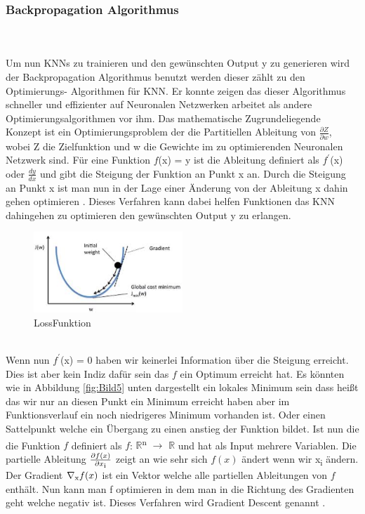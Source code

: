\documentclass{llncs}
\begin{document}
	\subsubsection{Backpropagation Algorithmus}\label{sec:test}
	~\\\\
	Um nun KNNs zu trainieren und den gewünschten Output y zu generieren wird der Backpropagation Algorithmus benutzt werden dieser zählt zu den Optimierungs- Algorithmen für KNN. Er konnte zeigen das dieser Algorithmus schneller und effizienter auf Neuronalen Netzwerken arbeitet als andere Optimierungsalgorithmen vor ihm. Das mathematische Zugrundeliegende Konzept ist ein Optimierungsproblem der die Partitiellen Ableitung von  $\frac{\partial Z}{\partial w}$, wobei Z die Zielfunktion und w die Gewichte im zu optimierenden Neuronalen Netzwerk sind. Für eine Funktion $f$(x) = y ist die Ableitung definiert als $f^\prime$(x) oder $\frac{dy}{dx}$ und gibt die Steigung der Funktion an Punkt x an. Durch die Steigung an Punkt x ist man nun in der Lage einer Änderung von der Ableitung x dahin gehen optimieren \cite{Grundlagen}. Dieses Verfahren kann dabei helfen Funktionen das KNN  dahingehen zu optimieren den gewünschten Output y zu erlangen. 
	\\
	\begin{figure}[htbp] 
		\centering
		\includegraphics[width=0.5\textwidth]{gradient.png}
		\caption{LossFunktion}
		\label{fig:Bild6}
	\end{figure}
	\\
	Wenn nun $f^\prime$(x) = 0 haben wir keinerlei Information über die Steigung erreicht. Dies ist aber kein Indiz dafür sein das $f$ ein Optimum erreicht hat. Es könnten wie in Abbildung \ref{fig:Bild5} unten dargestellt ein lokales Minimum sein dass heißt das wir nur an diesen Punkt ein Minimum erreicht haben aber im Funktionsverlauf ein noch niedrigeres Minimum vorhanden ist. Oder einen Sattelpunkt welche ein Übergang zu einen anstieg der Funktion bildet.
	Ist nun die die Funktion $f$ definiert als $f$: $\mathbb{R}$\textsuperscript{n} $\rightarrow$  $\mathbb{R}$ und hat als Input mehrere Variablen. Die partielle Ableitung $\frac{\partial f(x)}{\partial x\textsubscript{i}}$ zeigt an wie sehr sich $f(x)$ ändert wenn wir x\textsubscript{i} ändern. Der Gradient $\nabla\textsubscript{x}f(x)$ ist ein Vektor welche alle partiellen Ableitungen von $f$ enthält. Nun kann man f optimieren in dem man in die Richtung des Gradienten geht welche negativ ist. Dieses Verfahren wird Gradient Descent genannt \cite{Grundlagen}.
	
\end{document}
